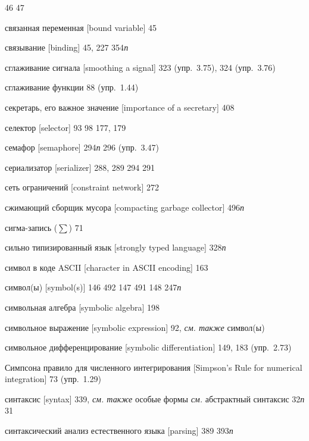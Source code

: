 \begin{theindex}
   46
   47
\item {связанная переменная [bound variable]} 45
\item {связывание [binding]} 45, 227
   354{\it п}
\item {сглаживание сигнала [smoothing a signal]} 323 (упр.~3.75), 324 (упр.~3.76)
\item {сглаживание функции} 88 (упр.~1.44)
\item {секретарь, его важное значение [importance of a secretary]} 408
\item {селектор [selector]} 93
   98
   177, 179
\item {семафор [semaphore]} 294{\it п}
   296 (упр.~3.47)
\item {сериализатор [serializer]} 288, 289
   294
   291
\item {сеть ограничений [constraint network]} 272
\item {сжимающий сборщик мусора [compacting garbage collector]} 496{\it п}
\item {сигма-запись ($\sum$)} 71
\item {сильно типизированный язык [strongly typed language]} 328{\it п}
\item {символ в коде ASCII [character in ASCII encoding]} 163
\item {символ(ы) [symbol(s)]} 146
   492
   147
   491
   148
   247{\it п}
\item {символьная алгебра [symbolic algebra]} 198
\item {символьное выражение [symbolic expression]} 92, {\it см. также} символ(ы)
\item {символьное дифференцирование [symbolic differentiation]} 149, 183 (упр.~2.73)
\item {Симпсона правило для численного интегрирования [Simpson's Rule for nu\-me\-ri\-cal integration]} 73 (упр.~1.29)
\item {синтаксис [syntax]} 339, {\it см. также} особые формы
   {\it см.} абстрактный синтаксис
   32{\it п}
   31
\item {синтаксический анализ естественного языка [parsing]} 389
   393{\it п}

\end{theindex}
